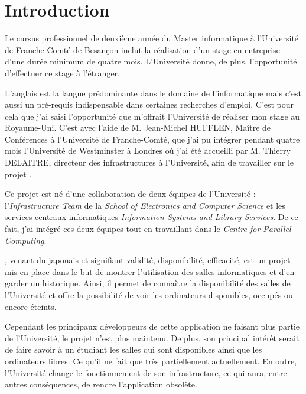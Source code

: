 \chapter*{Introduction}

Le cursus professionnel de deuxi\`eme ann\'ee du Master informatique \`a l'Universit\'e de Franche-Comt\'e de Besan\c{c}on inclut la r\'ealisation d'un stage en entreprise d'une dur\'ee minimum de quatre mois. 
L'Universit\'e donne, de plus, l'opportunit\'e d'effectuer ce stage \`a l'\'etranger.

L'anglais est la langue pr\'edominante dans le domaine de l'informatique mais c'est aussi un pr\'e-requis indispensable dans certaines recherches d'emploi.
C'est pour cela que j'ai saisi l'opportunit\'e que m'offrait l'Universit\'e de r\'ealiser mon stage au Royaume-Uni. 
C'est avec l'aide de M. Jean-Michel HUFFLEN, Ma\^itre de Conf\'erences \`a l'Universit\'e de Franche-Comt\'e, que j'ai pu int\'egrer pendant quatre mois l'Universit\'e de Westminster \`a Londres o\`u j'ai \'et\'e accueilli par M. Thierry DELAITRE, directeur des infrastructures \`a l'Universit\'e, afin de travailler sur le projet \YuukouII.

Ce projet est n\'e d'une collaboration de deux \'equipes de l'Universit\'e : l'\textit{Infrastructure Team} de la \textit{School of Electronics and Computer Science} et les services centraux informatiques \textit{Information Systems and Library Services}. 
De ce fait, j'ai int\'egr\'e ces deux \'equipes tout en travaillant dans le \textit{Centre for Parallel Computing}.

\Yuukou, venant du japonais et signifiant validit\'e, disponibilit\'e, efficacit\'e, est un projet mis en place dans le but de montrer l'utilisation des salles informatiques et d'en garder un historique.
Ainsi, il permet de conna\^itre la disponibilit\'e des salles de l'Universit\'e et offre la possibilit\'e de voir les ordinateurs disponibles, occup\'es ou encore \'eteints.

Cependant les principaux d\'eveloppeurs de cette application ne faisant plus partie de l'Universit\'e, le projet n'est plus maintenu.
De plus, son principal int\'er\^et serait de faire savoir \`a un \'etudiant les salles qui sont disponibles ainsi que les ordinateurs libres.
Ce qu'il ne fait que tr\`es partiellement actuellement.
En outre, l'Universit\'e change le fonctionnement de son infrastructure, ce qui aura, entre autres cons\'equences, de rendre l'application obsol\`ete.

